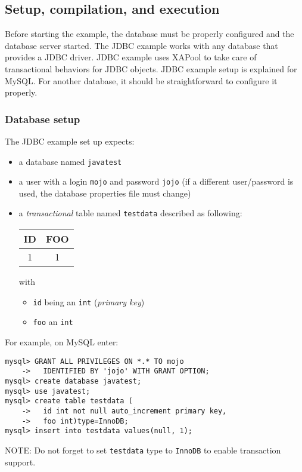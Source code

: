 \documentclass[a4paper,11pt]{article}
\begin{document}
\subsection{Setup, compilation, and execution}
\label{sec:jdbc_setup}

Before starting the example, the database must be properly
configured and the database server started.
The JDBC example works with any database that provides a JDBC
driver. JDBC example uses XAPool to take care of transactional
behaviors for JDBC objects.
JDBC example setup is explained for MySQL. For another database, it should be
straightforward to configure it properly.

\subsubsection{Database setup}
\label{sec:jdbc_db_setup}

The JDBC example set up expects:
\begin{itemize}
\item a database named \texttt{javatest}
\item a user with a login \texttt{mojo} and password \texttt{jojo}
(if a different user/password is used, the database properties file must change)
\item a \emph{transactional} table named \texttt{testdata} described as following:\\
  \begin{tabular}[t]{|c|c|}
    \hline ID & FOO \\
    \hline 1 & 1 \\
    \hline
  \end{tabular}
  with 
  \begin{itemize}
  \item \texttt{id} being an \texttt{int} (\emph{primary key})
  \item \texttt{foo} an \texttt{int}
  \end{itemize}
\end{itemize}

\noindent For example, on MySQL enter:
\begin{verbatim}
mysql> GRANT ALL PRIVILEGES ON *.* TO mojo
    ->   IDENTIFIED BY 'jojo' WITH GRANT OPTION;
mysql> create database javatest;
mysql> use javatest;
mysql> create table testdata (
    ->   id int not null auto_increment primary key,
    ->   foo int)type=InnoDB;
mysql> insert into testdata values(null, 1);
\end{verbatim}
NOTE: Do not forget to set \texttt{testdata} type to \texttt{InnoDB} to enable
transaction support.\\
\end{document}
